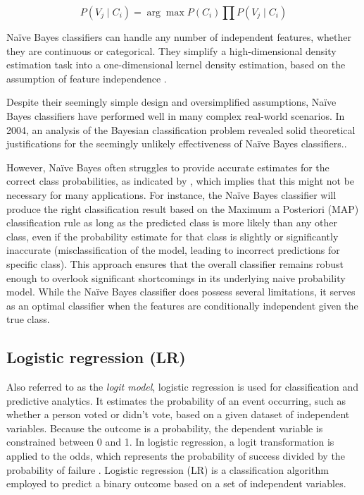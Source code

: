 \[ P(V_j \mid C_i) =  \arg \max{ P(C_i) \prod P(V_j \mid C_i)} \]

Naïve Bayes classifiers can handle any number of independent features, whether they are continuous or categorical. They simplify a high-dimensional density estimation task into a one-dimensional kernel density estimation, based on the assumption of feature independence \cite{Anna_L2016}.

Despite their seemingly simple design and oversimplified assumptions, Naïve Bayes classifiers have performed well in many complex real-world scenarios. In 2004, an analysis of the Bayesian classification problem revealed solid theoretical justifications for the seemingly unlikely effectiveness of Naïve Bayes classifiers.\cite{Harry_Zhang2004}.

However, Naïve Bayes often struggles to provide accurate estimates for the correct class probabilities, as indicated by \cite{Niculescu_Mizil2005}, which implies that this might not be necessary for many applications. For instance, the Naïve Bayes classifier will produce the right classification result based on the Maximum a Posteriori (MAP) \cite{MAP_WIKI} classification rule as long as the predicted class is more likely than any other class, even if the probability estimate for that class is slightly or significantly inaccurate (misclassification of the model, leading to incorrect predictions for specific class). This approach ensures that the overall classifier remains robust enough to overlook significant shortcomings in its underlying naive probability model. While the Naïve Bayes classifier does possess several limitations, it serves as an optimal classifier when the features are conditionally independent given the true class.


\subsection{Logistic regression (LR)} %
\label{sub: Logistic_regression}

Also referred to as the \textit{logit model}, logistic regression is used for classification and predictive analytics. It estimates the probability of an event occurring, such as whether a person voted or didn't vote, based on a given dataset of independent variables. Because the outcome is a probability, the dependent variable is constrained between 0 and 1. In logistic regression, a logit transformation is applied to the odds, which represents the probability of success divided by the probability of failure \cite{IBM2022}. Logistic regression (LR) is a classification algorithm employed to predict a binary outcome based on a set of independent variables.

